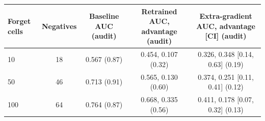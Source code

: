 \begin{tabular}{lcccc}
\toprule
Forget cells & Negatives & Baseline AUC (audit) & Retrained AUC, advantage (audit) & Extra-gradient AUC, advantage [CI] (audit) \\
\midrule
10 & 18 & 0.567 (0.87) & 0.454, 0.107 (0.32) & 0.326, 0.348 [0.14, 0.63] (0.19) \\
50 & 46 & 0.713 (0.91) & 0.565, 0.130 (0.60) & 0.374, 0.251 [0.11, 0.41] (0.12) \\
100 & 64 & 0.764 (0.87) & 0.668, 0.335 (0.56) & 0.411, 0.178 [0.07, 0.32] (0.13) \\
\bottomrule
\end{tabular}
